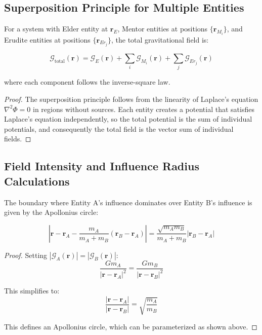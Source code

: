 \subsection{Superposition Principle for Multiple Entities}

\begin{theorem}
For a system with Elder entity at $\mathbf{r}_E$, Mentor entities at positions $\{\mathbf{r}_{M_i}\}$, and Erudite entities at positions $\{\mathbf{r}_{Er_j}\}$, the total gravitational field is:

\begin{equation}
\mathcal{G}_{\text{total}}(\mathbf{r}) = \mathcal{G}_E(\mathbf{r}) + \sum_i \mathcal{G}_{M_i}(\mathbf{r}) + \sum_j \mathcal{G}_{Er_j}(\mathbf{r})
\end{equation}

where each component follows the inverse-square law.
\end{theorem}

\begin{proof}
The superposition principle follows from the linearity of Laplace's equation $\nabla^2 \Phi = 0$ in regions without sources. Each entity creates a potential that satisfies Laplace's equation independently, so the total potential is the sum of individual potentials, and consequently the total field is the vector sum of individual fields.
\end{proof}

\subsection{Field Intensity and Influence Radius Calculations}

\begin{theorem}
The boundary where Entity A's influence dominates over Entity B's influence is given by the Apollonius circle:

\begin{equation}
\left|\mathbf{r} - \mathbf{r}_A - \frac{m_A}{m_A + m_B}(\mathbf{r}_B - \mathbf{r}_A)\right| = \frac{\sqrt{m_A m_B}}{m_A + m_B}|\mathbf{r}_B - \mathbf{r}_A|
\end{equation}
\end{theorem}

\begin{proof}
Setting $|\mathcal{G}_A(\mathbf{r})| = |\mathcal{G}_B(\mathbf{r})|$:
\begin{equation}
\frac{G m_A}{|\mathbf{r} - \mathbf{r}_A|^2} = \frac{G m_B}{|\mathbf{r} - \mathbf{r}_B|^2}
\end{equation}

This simplifies to:
\begin{equation}
\frac{|\mathbf{r} - \mathbf{r}_A|}{|\mathbf{r} - \mathbf{r}_B|} = \sqrt{\frac{m_A}{m_B}}
\end{equation}

This defines an Apollonius circle, which can be parameterized as shown above.
\end{proof}

